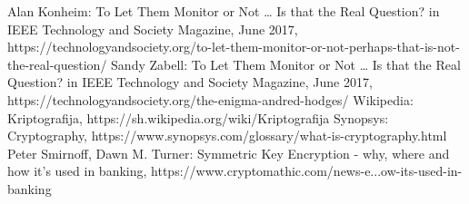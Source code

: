 \documentclass[a4paper]{article}
\begin{document}
\newpage

\appendix

\iffalse


\fi

\begin{thebibliography}{21}
 Alan Konheim: To Let Them Monitor or Not … Is that the Real Question? in IEEE Technology and Society Magazine, June 2017, https://technologyandsociety.org/to-let-them-monitor-or-not-perhaps-that-is-not-the-real-question/
 Sandy Zabell: To Let Them Monitor or Not … Is that the Real Question? in IEEE Technology and Society Magazine, June 2017, https://technologyandsociety.org/the-enigma-andred-hodges/
 Wikipedia: Kriptografija, https://sh.wikipedia.org/wiki/Kriptografija
 Synopsys: Cryptography, https://www.synopsys.com/glossary/what-is-cryptography.html
 Peter Smirnoff, Dawn M. Turner: Symmetric Key Encryption - why, where and how it’s used in banking, https://www.cryptomathic.com/news-e...ow-its-used-in-banking 

\end{thebibliography}
\end{document}
